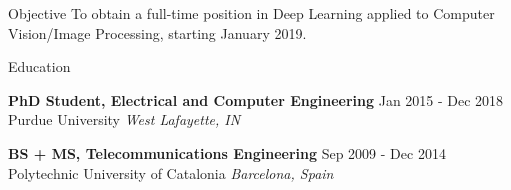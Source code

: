 \documentclass{resume} %
\begin{document}
\vspace{-8pt}
\begin{rSection}{Objective}
To obtain a full-time position in Deep Learning applied to Computer Vision/Image Processing, starting January 2019.

\end{rSection}

\begin{rSection}{Education}

{\bf PhD Student, Electrical and Computer Engineering} \hfill {Jan 2015 - Dec 2018} \\
Purdue University \hfill {\em West Lafayette, IN\\}


{\bf BS + MS, Telecommunications Engineering} \hfill {Sep 2009 - Dec 2014} \\ 
Polytechnic University of Catalonia \hfill {\em Barcelona, Spain}

\vspace{-1pt}

\end{rSection}

\end{document}
